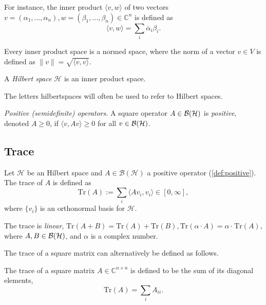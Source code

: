 \begin{example}
  For instance, the inner product $ \langle v, w \rangle$ of two vectors $ v = (\alpha_1, \ldots, \alpha_n ),w = (\beta_1, \ldots, \beta_n) \in \mathbb{C}^{n}$ is defined as
\begin{equation*}
  \langle v, w \rangle = \sum_{i} \overline{\alpha}_i \beta_i. 
\end{equation*}
\end{example}


Every inner product space is a normed space, where the norm of a vector $v \in V$ is defined as $\|v\| = \sqrt{\langle v, v \rangle}$.


\begin{definition}
  A \emph{Hilbert space} $\mathcal{H}$ is an inner product space.
\end{definition}


The letters \gls{hilbertspaces} will often be used to refer to Hilbert spaces.

\begin{definition} \label{def:positive}
  \emph{Positive (semidefinite) operators}. A square operator $A\in \mathcal{B}(\mathcal{H})$ is \emph{positive}, denoted $A \geq 0$, if $\langle v, Av \rangle \geq 0$ for all $v \in  \mathcal{B}(\mathcal{H})$.    
\end{definition}



\subsection{Trace}


\begin{definition} \label{def:trace} 
  Let $\mathcal{H}$ be an Hilbert space and $ A \in \mathcal{B}(\mathcal{H})$ a positive operator (\autoref{def:positive}). The trace of $A$ is defined as 
\[
\text{Tr}(A) := \sum_i \langle A v_i, v_i \rangle \in [0, \infty],
\]
where $\{v_i\}$ is an orthonormal basis for $\mathcal{H}$.
\end{definition}


The trace is \emph{linear}, $\text{Tr}(A + B) = \text{Tr}(A)+\text{Tr}(B), \text{Tr}(\alpha \cdot A) = \alpha \cdot \hspace{1pt} \text{Tr}(A)$, where $A, B \in \mathcal{B}(\mathcal{H})$, and $\alpha$ is a complex number.

The trace of a square matrix can alternatively be defined as follows.

\begin{definition}
  The trace of a square matrix $A\in \mathbb{C}^{n\times n}$ is defined to be the sum of its diagonal elements,
\begin{equation*}
  \text{Tr}(A)= \sum_{i} A_{ii}.
\end{equation*}

\end{definition}

